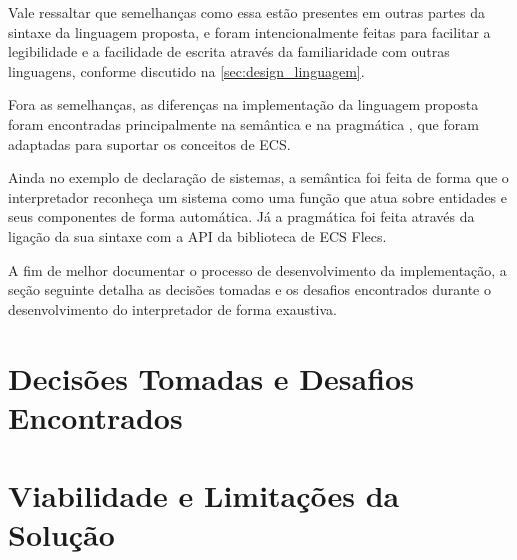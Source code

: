 Vale ressaltar que semelhanças como essa estão presentes em outras partes da sintaxe da linguagem proposta, e foram intencionalmente feitas para facilitar a legibilidade e a facilidade de escrita através da familiaridade com outras linguagens, conforme discutido na \autoref{sec:design_linguagem}.

Fora as semelhanças, as diferenças na implementação da linguagem proposta foram encontradas principalmente na semântica e na pragmática \cite{designconceptsinlanguages}, que foram adaptadas para suportar os conceitos de ECS.

Ainda no exemplo de declaração de sistemas, a semântica foi feita de forma que o interpretador reconheça um sistema como uma função que atua sobre entidades e seus componentes de forma automática. Já a pragmática foi feita através da ligação da sua sintaxe com a API da biblioteca de ECS Flecs.

A fim de melhor documentar o processo de desenvolvimento da implementação, a seção seguinte detalha as decisões tomadas e os desafios encontrados durante o desenvolvimento do interpretador de forma exaustiva.

\section{Decisões Tomadas e Desafios Encontrados}

\section{Viabilidade e Limitações da Solução}
